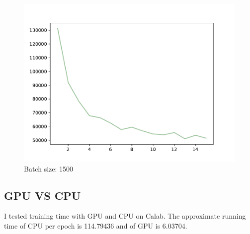 \documentclass{article}
\begin{document}
\begin{figure}[!h]
{\begin{minipage}{0.21\linewidth}
  \includegraphics[scale=0.23]{imgs/test_loss_1500.pdf}
  \end{minipage}
}
\quad
{}
\caption{ Batch size: 1500}
\label{bs1500}
\end{figure}

\subsection{GPU VS CPU}
I tested training time with GPU and CPU on Calab. The approximate running time of CPU per epoch is 114.79436 and of GPU is 6.03704. 
\end{document}
